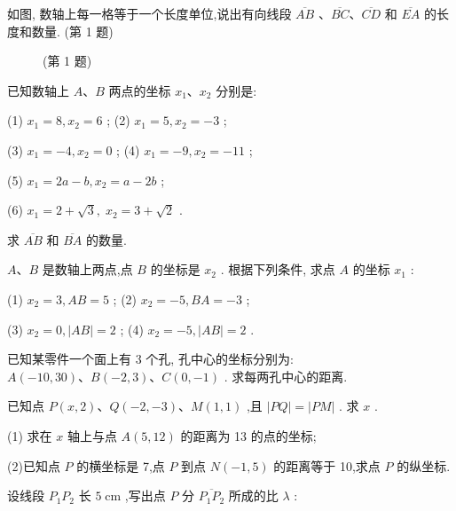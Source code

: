 \documentclass[lang=cn,newtx,10.5pt,scheme=chinese]{elegantbook}
\begin{document}
\begin{problemset}[习 题 一]

\item 如图, 数轴上每一格等于一个长度单位,说出有向线段 \(\overline{AB}\) 、\(\overline{BC}\text{、}\overline{CD}\) 和 \(\overline{EA}\) 的长度和数量. (第 1 题)
\begin{figure}[h]
  \centering
  
  \caption{(第 1 题)}
\end{figure}

\item 已知数轴上 \(A\text{、}B\) 两点的坐标 \({x}_{1}\text{、}{x}_{2}\) 分别是:

(1) \({x}_{1} = 8,{x}_{2} = 6\) ; (2) \({x}_{1} = 5,{x}_{2} = - 3\) ;

(3) \({x}_{1} = - 4,{x}_{2} = 0\) ; (4) \({x}_{1} = - 9,{x}_{2} = - {11}\) ;

(5) \({x}_{1} = {2a} - b,{x}_{2} = a - {2b}\) ;

(6) \({x}_{1} = 2 + \sqrt{3},\;{x}_{2} = 3 + \sqrt{2}\) .

求 \(\overline{AB}\) 和 \(\overline{BA}\) 的数量.

\item \(A\text{、}B\) 是数轴上两点,点 \(B\) 的坐标是 \({x}_{2}\) . 根据下列条件, 求点 \(A\) 的坐标 \({x}_{1}\) :

(1) \({x}_{2} = 3,{AB} = 5\) ; (2) \({x}_{2} = - 5,{BA} = - 3\) ;

(3) \({x}_{2} = 0,\left| {AB}\right| = 2\) ; (4) \({x}_{2} = - 5,\left| {AB}\right| = 2\) .

\item 已知某零件一个面上有 3 个孔, 孔中心的坐标分别为: \(A\left( {-{10},{30}}\right) \text{、}B\left( {-2,3}\right) \text{、}C\left( {0, - 1}\right)\) . 求每两孔中心的距离.

\item 已知点 \(P\left( {x,2}\right) \text{、}Q\left( {-2, - 3}\right) \text{、}M\left( {1,1}\right)\) ,且 \(\left| {PQ}\right| = \left| {PM}\right|\) . 求 \(x\) .

\item (1) 求在 \(x\) 轴上与点 \(A\left( {5,{12}}\right)\) 的距离为 13 的点的坐标;

(2)已知点 \(P\) 的横坐标是 7,点 \(P\) 到点 \(N\left( {-1,5}\right)\) 的距离等于 10,求点 \(P\) 的纵坐标.

\item 设线段 \({P}_{1}{P}_{2}\) 长 \(5\mathrm{\;{cm}}\) ,写出点 \(P\) 分 \(\overline{{P}_{1}{P}_{2}}\) 所成的比 \(\lambda\) :


\end{problemset}
\end{document}
